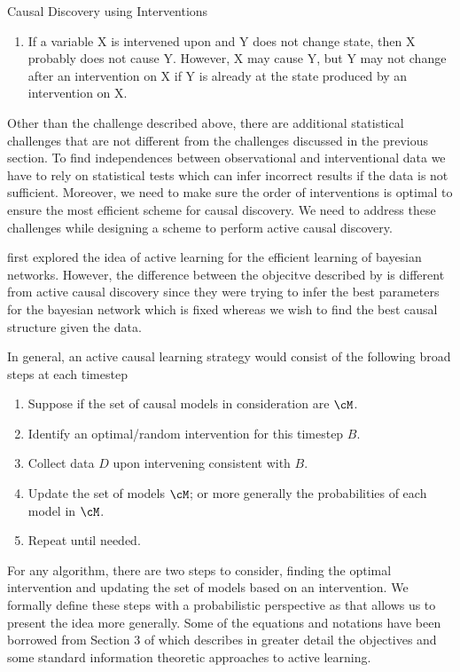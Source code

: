 \documentclass[10pt]{article}
\begin{document}
\begin{psection}[4]{Causal Discovery using Interventions}
\begin{enumerate}
        \item If a variable X is intervened upon and Y does not change state, then X
            probably does not cause Y. However, X may cause Y, but Y may not change
            after an intervention on X if Y is already at the state produced by an
            intervention on X.
    \end{enumerate}

    Other than the challenge described above, there are additional statistical
    challenges that are not different from the challenges discussed in the previous
    section. To find independences between observational and interventional data we have
    to rely on statistical tests which can infer incorrect results if the data is not
    sufficient. Moreover, we need to make sure the order of interventions is optimal to
    ensure the most efficient scheme for causal discovery. We need to address these
    challenges while designing a scheme to perform active causal discovery.

    \citet{tong2001active} first explored the idea of active learning for the efficient
    learning of bayesian networks. However, the difference between the objecitve
    described by \citet{tong2001active} is different from active causal discovery since
    they were trying to infer the best parameters for the bayesian network which is
    fixed whereas we wish to find the best causal structure given the data.

    In general, an active causal learning strategy would consist of the following broad
    steps at each timestep
    \begin{enumerate}[itemsep=-1pt,topsep=0pt]
        \item Suppose if the set of causal models in consideration are $\cM$.
        \item Identify an optimal/random intervention for this timestep $B$.
        \item Collect data $D$ upon intervening consistent with $B$.
        \item Update the set of models $\cM$; or more generally the probabilities of
            each model in $\cM$.
        \item Repeat until needed.
    \end{enumerate}

    For any algorithm, there are two steps to consider, finding the optimal intervention
    and updating the set of models based on an intervention. We formally define these
    steps with a probabilistic perspective as that allows us to present the idea more
    generally. Some of the equations and notations have been borrowed from Section 3 of
    \citep{neil2017} which describes in greater detail the objectives and some standard
    information theoretic approaches to active learning.


\end{psection}
\end{document}
